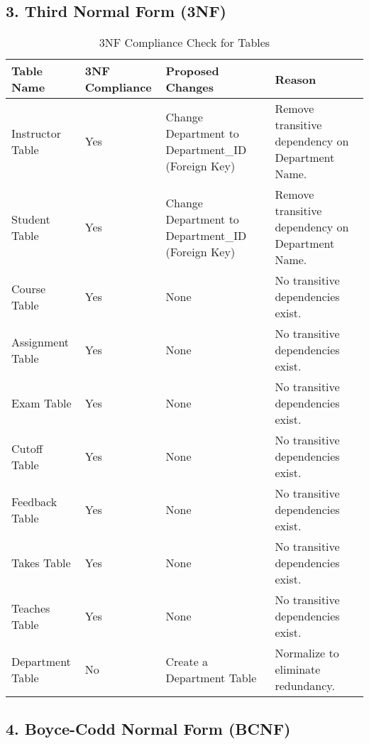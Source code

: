 \documentclass[12pt]{article}
\begin{document}
\subsection*{3. Third Normal Form (3NF)}
\begin{table}[ht]
    \centering
    \begin{tabularx}{\textwidth}{|X|X|X|X|}
        \hline
        \textbf{Table Name} & \textbf{3NF Compliance} & \textbf{Proposed Changes} & \textbf{Reason} \\
        \hline
        Instructor Table & Yes & Change Department to Department\_ID (Foreign Key) & Remove transitive dependency on Department Name. \\
        \hline
        Student Table & Yes & Change Department to Department\_ID (Foreign Key) & Remove transitive dependency on Department Name. \\
        \hline
        Course Table & Yes & None & No transitive dependencies exist. \\
        \hline
        Assignment Table & Yes & None & No transitive dependencies exist. \\
        \hline
        Exam Table & Yes & None & No transitive dependencies exist. \\
        \hline
        Cutoff Table & Yes & None & No transitive dependencies exist. \\
        \hline
        Feedback Table & Yes & None & No transitive dependencies exist. \\
        \hline
        Takes Table & Yes & None & No transitive dependencies exist. \\
        \hline
        Teaches Table & Yes & None & No transitive dependencies exist. \\
        \hline
        Department Table & No & Create a Department Table & Normalize to eliminate redundancy. \\
        \hline
    \end{tabularx}
    \caption{3NF Compliance Check for Tables}
    \label{tab:3nf_compliance}
\end{table}



\pagebreak

\subsection*{4. Boyce-Codd Normal Form (BCNF)}
\end{document}
